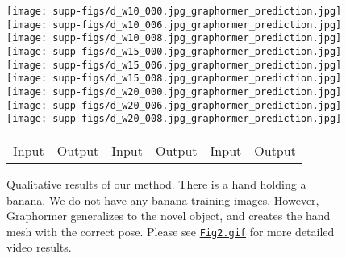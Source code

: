 \begin{figure*}
\begin{center}
\texttt{[image: supp-figs/d\_w10\_000.jpg\_graphormer\_prediction.jpg]}
\texttt{[image: supp-figs/d\_w10\_006.jpg\_graphormer\_prediction.jpg]}
\texttt{[image: supp-figs/d\_w10\_008.jpg\_graphormer\_prediction.jpg]}
\texttt{[image: supp-figs/d\_w15\_000.jpg\_graphormer\_prediction.jpg]}
\texttt{[image: supp-figs/d\_w15\_006.jpg\_graphormer\_prediction.jpg]}
\texttt{[image: supp-figs/d\_w15\_008.jpg\_graphormer\_prediction.jpg]}
\texttt{[image: supp-figs/d\_w20\_000.jpg\_graphormer\_prediction.jpg]}
\texttt{[image: supp-figs/d\_w20\_006.jpg\_graphormer\_prediction.jpg]}
\texttt{[image: supp-figs/d\_w20\_008.jpg\_graphormer\_prediction.jpg]}
\vspace{-2mm}
\setlength{\tabcolsep}{30pt}
\begin{tabular}{cccccc}
Input & Output &  Input & Output &  Input & Output
\end{tabular}
\caption{
Qualitative results of our method. There is a hand holding a banana. We do not have any banana training images. However, Graphormer generalizes to the novel object, and creates the hand mesh with the correct pose. Please see \href{https://github.com/microsoft/MeshGraphormer/blob/main/docs/Fig2.gif}{\texttt{Fig2.gif}} for more detailed video results.
} 
\label{fig:vis_hand_2}
\end{center}
\end{figure*} 

